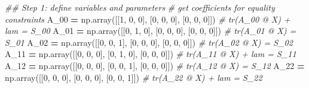 \documentclass[
]{book}
\newenvironment{Shaded}{\begin{snugshade}}{\end{snugshade}}
\newcommand{\CommentTok}[1]{\textcolor[rgb]{0.56,0.35,0.01}{\textit{#1}}}
\newcommand{\DecValTok}[1]{\textcolor[rgb]{0.00,0.00,0.81}{#1}}
\newcommand{\NormalTok}[1]{#1}
\newcommand{\OperatorTok}[1]{\textcolor[rgb]{0.81,0.36,0.00}{\textbf{#1}}}
\theoremstyle{definition}
\theoremstyle{definition}
\theoremstyle{definition}
\theoremstyle{definition}
\theoremstyle{remark}
\begin{document}
\begin{Shaded}
\begin{Highlighting}[]
\CommentTok{\#\# Step 1: define variables and parameters}
\CommentTok{\# get coefficients for equality constraints}
\NormalTok{A\_00 }\OperatorTok{=}\NormalTok{ np.array([[}\DecValTok{1}\NormalTok{, }\DecValTok{0}\NormalTok{, }\DecValTok{0}\NormalTok{], [}\DecValTok{0}\NormalTok{, }\DecValTok{0}\NormalTok{, }\DecValTok{0}\NormalTok{], [}\DecValTok{0}\NormalTok{, }\DecValTok{0}\NormalTok{, }\DecValTok{0}\NormalTok{]]) }\CommentTok{\# tr(A\_00 @ X) + lam = S\_00}
\NormalTok{A\_01 }\OperatorTok{=}\NormalTok{ np.array([[}\DecValTok{0}\NormalTok{, }\DecValTok{1}\NormalTok{, }\DecValTok{0}\NormalTok{], [}\DecValTok{0}\NormalTok{, }\DecValTok{0}\NormalTok{, }\DecValTok{0}\NormalTok{], [}\DecValTok{0}\NormalTok{, }\DecValTok{0}\NormalTok{, }\DecValTok{0}\NormalTok{]]) }\CommentTok{\# tr(A\_01 @ X) = S\_01}
\NormalTok{A\_02 }\OperatorTok{=}\NormalTok{ np.array([[}\DecValTok{0}\NormalTok{, }\DecValTok{0}\NormalTok{, }\DecValTok{1}\NormalTok{], [}\DecValTok{0}\NormalTok{, }\DecValTok{0}\NormalTok{, }\DecValTok{0}\NormalTok{], [}\DecValTok{0}\NormalTok{, }\DecValTok{0}\NormalTok{, }\DecValTok{0}\NormalTok{]]) }\CommentTok{\# tr(A\_02 @ X) = S\_02}
\NormalTok{A\_11 }\OperatorTok{=}\NormalTok{ np.array([[}\DecValTok{0}\NormalTok{, }\DecValTok{0}\NormalTok{, }\DecValTok{0}\NormalTok{], [}\DecValTok{0}\NormalTok{, }\DecValTok{1}\NormalTok{, }\DecValTok{0}\NormalTok{], [}\DecValTok{0}\NormalTok{, }\DecValTok{0}\NormalTok{, }\DecValTok{0}\NormalTok{]]) }\CommentTok{\# tr(A\_11 @ X) + lam = S\_11}
\NormalTok{A\_12 }\OperatorTok{=}\NormalTok{ np.array([[}\DecValTok{0}\NormalTok{, }\DecValTok{0}\NormalTok{, }\DecValTok{0}\NormalTok{], [}\DecValTok{0}\NormalTok{, }\DecValTok{0}\NormalTok{, }\DecValTok{1}\NormalTok{], [}\DecValTok{0}\NormalTok{, }\DecValTok{0}\NormalTok{, }\DecValTok{0}\NormalTok{]]) }\CommentTok{\# tr(A\_12 @ X) = S\_12}
\NormalTok{A\_22 }\OperatorTok{=}\NormalTok{ np.array([[}\DecValTok{0}\NormalTok{, }\DecValTok{0}\NormalTok{, }\DecValTok{0}\NormalTok{], [}\DecValTok{0}\NormalTok{, }\DecValTok{0}\NormalTok{, }\DecValTok{0}\NormalTok{], [}\DecValTok{0}\NormalTok{, }\DecValTok{0}\NormalTok{, }\DecValTok{1}\NormalTok{]]) }\CommentTok{\# tr(A\_22 @ X) + lam = S\_22}


\end{Highlighting}
\end{Shaded}
\end{document}
